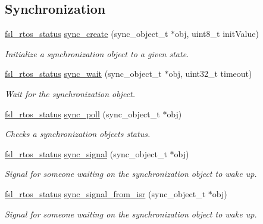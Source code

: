 \subsection*{Synchronization}
\begin{DoxyCompactItemize}
\item 
\hyperlink{group__os__abstraction_gaea1a100f413fd124de281c4b493e99d5}{fsl\+\_\+rtos\+\_\+status} \hyperlink{group__os__abstraction_gaf560cdf78a1bbc00dc4de5be6fa257be}{sync\+\_\+create} (sync\+\_\+object\+\_\+t $\ast$obj, uint8\+\_\+t init\+Value)
\begin{DoxyCompactList}\small\item\em Initialize a synchronization object to a given state. \end{DoxyCompactList}\item 
\hyperlink{group__os__abstraction_gaea1a100f413fd124de281c4b493e99d5}{fsl\+\_\+rtos\+\_\+status} \hyperlink{group__os__abstraction_gafaa325fb10ff6be52e6a7b8d28b0d4c1}{sync\+\_\+wait} (sync\+\_\+object\+\_\+t $\ast$obj, uint32\+\_\+t timeout)
\begin{DoxyCompactList}\small\item\em Wait for the synchronization object. \end{DoxyCompactList}\item 
\hyperlink{group__os__abstraction_gaea1a100f413fd124de281c4b493e99d5}{fsl\+\_\+rtos\+\_\+status} \hyperlink{group__os__abstraction_gab70fa60df290353c201281d96f7b3239}{sync\+\_\+poll} (sync\+\_\+object\+\_\+t $\ast$obj)
\begin{DoxyCompactList}\small\item\em Checks a synchronization object\textquotesingle{}s status. \end{DoxyCompactList}\item 
\hyperlink{group__os__abstraction_gaea1a100f413fd124de281c4b493e99d5}{fsl\+\_\+rtos\+\_\+status} \hyperlink{group__os__abstraction_ga3c2aad57091388c40421dea8a9b0f1ed}{sync\+\_\+signal} (sync\+\_\+object\+\_\+t $\ast$obj)
\begin{DoxyCompactList}\small\item\em Signal for someone waiting on the synchronization object to wake up. \end{DoxyCompactList}\item 
\hyperlink{group__os__abstraction_gaea1a100f413fd124de281c4b493e99d5}{fsl\+\_\+rtos\+\_\+status} \hyperlink{group__os__abstraction_gaf00e451307882e8fce2db736550ae4a2}{sync\+\_\+signal\+\_\+from\+\_\+isr} (sync\+\_\+object\+\_\+t $\ast$obj)
\begin{DoxyCompactList}\small\item\em Signal for someone waiting on the synchronization object to wake up. \end{DoxyCompactList}\item 

\end{DoxyCompactItemize}
